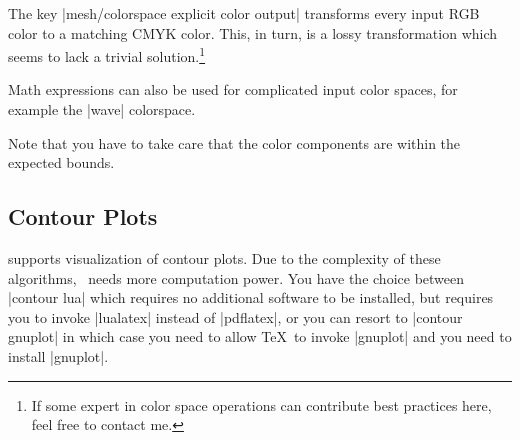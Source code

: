{{\pgfplotsexpensiveexample
\begin{codeexample}[]
\end{codeexample}
%
\noindent The key |mesh/colorspace explicit color output| transforms every
input RGB color to a matching CMYK color. This, in turn, is a lossy
transformation which seems to lack a trivial solution.\footnote{If some expert
in color space operations can contribute best practices here, feel free to
contact me.}

Math expressions can also be used for complicated input color spaces, for
example the |wave| colorspace.
%
\begin{codeexample}[]
\end{codeexample}

Note that you have to take care that the color components are within the
expected bounds.
}%


\subsection{Contour Plots}
{
%
%
%
\PGFPlots{} supports visualization of contour plots. Due to the complexity of these algorithms, \PGFPlots\ needs more computation power. You have the choice between |contour lua| which requires no additional software to be installed, but requires you to invoke |lualatex| instead of |pdflatex|, or you can resort to |contour gnuplot| in which case you need to allow \TeX\ to invoke |gnuplot| and you need to install |gnuplot|.

}}
